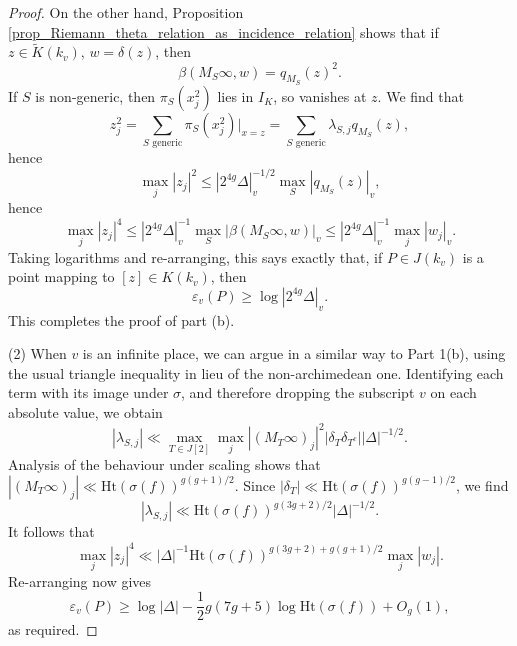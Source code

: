 \documentclass[10pt,a4paper]{amsart}
\newcommand{\height}{\mathrm{Ht}}
\begin{document}
\begin{proof}
    On the other hand, Proposition \ref{prop_Riemann_theta_relation_as_incidence_relation} shows that if $z \in \widetilde{K}(k_v)$, $w = \delta(z)$, then
    \[ \beta(M_S \infty, w) = q_{M_S}(z)^2. \]
    If $S$ is non-generic, then $\pi_S(x_j^2)$ lies in $I_K$, so vanishes at $z$. We find that
    \[ z_j^2 = \sum_{S \text{ generic}} \pi_S(x_j^2)|_{x = z} = \sum_{S \text{ generic}} \lambda_{S, j} q_{M_S}(z), \]
    hence 
    \[ \max_j |z_j|^2 \leq | 2^{4g} \Delta |_v^{-1/2} \max_S |q_{M_S}(z)|_v, \]
    hence
    \[ \max_j |z_j|^4 \leq |2^{4g} \Delta|_v^{-1} \max_S |\beta( M_S \infty,w)|_v \leq |2^{4g} \Delta|_v^{-1} \max_j |w_j|_v. \]
    Taking logarithms and re-arranging, this says exactly that, if $P \in J(k_v)$ is a point mapping to $[z] \in K(k_v)$, then
    \[ \varepsilon_v(P) \geq \log |2^{4g} \Delta|_v. \]
    This completes the proof of part (b).

    (2) When $v$ is an infinite place, we can argue in a similar way to Part 1(b), using the usual triangle inequality in lieu of the non-archimedean one.
    Identifying each term with its image under $\sigma$, and therefore dropping the subscript $v$ on each absolute value, we obtain
    \[ | \lambda_{S, j} | \ll \max_{T \in J[2]} \max_j | (M_T \infty)_j |^2 |\delta_T \delta_{T^c}| |\Delta|^{-1/2}.  \]
    Analysis of the behaviour under scaling shows that $| (M_T \infty)_j | \ll \height(\sigma(f))^{g(g+1)/2}$. Since $|\delta_T| \ll \height(\sigma(f))^{g(g-1)/2}$, we find 
    \[ | \lambda_{S, j} | \ll \height(\sigma(f))^{g(3g+2)/2} |\Delta|^{-1/2}. \]
    It follows that
    \[ \max_j | z_j |^4 \ll |\Delta|^{-1} \height(\sigma(f))^{g(3g+2) + g(g+1)/2} \max_j | w_j |. \]
    Re-arranging now gives
    \[ \varepsilon_v(P) \geq \log | \Delta | - \frac{1}{2} g(7g+5) \log \height(\sigma(f))  + O_g(1), \]
    as required. 
\end{proof}
\end{document}
